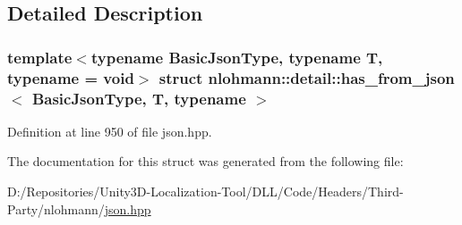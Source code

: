 \subsection{Detailed Description}
\subsubsection*{template$<$typename Basic\+Json\+Type, typename T, typename = void$>$\newline
struct nlohmann\+::detail\+::has\+\_\+from\+\_\+json$<$ Basic\+Json\+Type, T, typename $>$}



Definition at line 950 of file json.\+hpp.



The documentation for this struct was generated from the following file\+:\begin{DoxyCompactItemize}
\item 
D\+:/\+Repositories/\+Unity3\+D-\/\+Localization-\/\+Tool/\+D\+L\+L/\+Code/\+Headers/\+Third-\/\+Party/nlohmann/\mbox{\hyperlink{json_8hpp}{json.\+hpp}}\end{DoxyCompactItemize}
